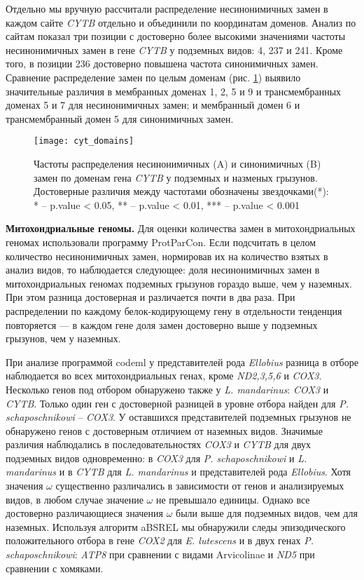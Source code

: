 Отдельно мы вручную рассчитали распределение несинонимичных замен в каждом сайте \textit{CYTB} отдельно и объединили по координатам доменов. Анализ по сайтам показал три позиции с достоверно более высокими значениями частоты несинонимичных замен в гене \textit{CYTB} у подземных видов: 4, 237 и 241. Кроме того, в позиции 236 достоверно повышена частота синонимичных замен. Сравнение распределение замен по целым доменам (рис. \ref{Cyt_Dom_fig}) выявило значительные различия в мембранных доменах 1, 2, 5 и 9 и трансмембранных доменах 5 и 7 для несинонимичных замен; и мембранный домен 6 и трансмембранный домен 5 для синонимичных замен.

\begin{figure}[h!]
	\begin{center}
		\texttt{[image: cyt\_domains]}
	\end{center}
	\caption{Частоты распределения несинонимичных (A) и синонимичных (B) замен по доменам гена \textit{CYTB} у подземных и назменых грызунов. Достоверные различия между частотами обозначены звездочками(*): * -- p.value < 0.05, ** -- p.value < 0.01, *** -- p.value < 0.001 }\label{Cyt_Dom_fig}
\end{figure} 

\textbf{Митохондриальные геномы.} Для оценки количества замен в митохондриальных геномах использовали программу ProtParCon. Если подсчитать в целом количество несинонимичных замен, нормировав их на количество взятых в анализ видов, то наблюдается следующее: доля несинонимичных замен в митохондриальных геномах подземных грызунов гораздо выше, чем у наземных. При этом разница достоверная и различается почти в два раза. При распределении по каждому белок-кодирующему гену в отдельности тенденция повторяется --- в каждом гене доля замен достоверно выше у подземных грызунов, чем у наземных.

При анализе программой codeml у представителей рода \textit{Ellobius} разница в отборе наблюдается во всех митохондриальных генах, кроме \textit{ND2,3,5,6} и \textit{COX3}. Несколько генов под отбором обнаружено также у \textit{L. mandarinus}: \textit{COX3} и \textit{CYTB}. Только один ген с достоверной разницей в уровне отбора найден для \textit{P. schaposchnikowi} -- \textit{COX3}. У оставшихся представителей подземных грызунов не обнаружено генов с достоверным отличием от наземных видов. Значимые различия наблюдались в последовательностях \textit{COX3} и \textit{CYTB} для двух подземных видов одновременно: в \textit{COX3} для \textit{P. schaposchnikowi} и \textit{L. mandarinus} и в \textit{CYTB} для \textit{L. mandarinus} и представителей рода \textit{Ellobius}. Хотя значения $\omega$ существенно различались в зависимости от генов и анализируемых видов, в любом случае значение $\omega$ не превышало единицы. Однако все достоверно различающиеся значения $\omega$ были выше для подземных видов, чем для наземных. Используя алгоритм aBSREL мы обнаружили следы эпизодического положительного отбора в гене \textit{COX2} для \textit{E. lutescens} и в двух генах \textit{P. schaposchnikowi}: \textit{ATP8} при сравнении с видами Arvicolinae и \textit{ND5} при сравнении с хомяками. 

